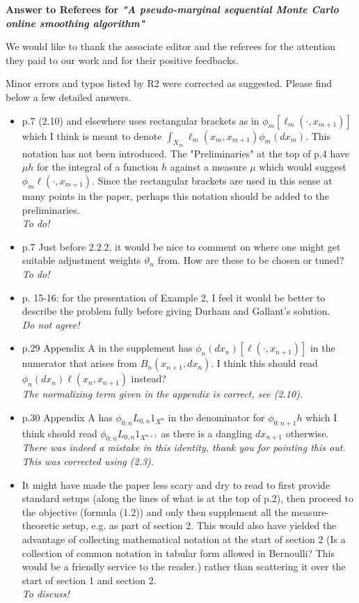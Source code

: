 \documentclass[12pt]{amsart}
\begin{document}
\begin{center}
\textbf{Answer to Referees for \textit{"A pseudo-marginal sequential Monte Carlo online smoothing algorithm"}}
\end{center}

\bigskip

We would like to thank the associate editor and the referees for the attention they paid to our work and for their positive feedbacks. 

\bigskip

Minor errors and typos listed by R2 were corrected as suggested. Please find below a few detailed answers.


\begin{itemize}
\item p.7 (2.10) and elsewhere uses rectangular brackets as in $\phi_m[\ell_m(\cdot,x_{m+1})]$ which I think is meant to denote $\int_{X_m}\ell_m(x_m,x_{m+1})\phi_m(dx_m)$. This notation has not been introduced. The "Preliminaries" at the top of p.4 have $\mu h$ for the integral of a function $h$ against a measure $\mu$ which would suggest $\phi_m \ell(\cdot,x_{m+1})$. Since the rectangular brackets are used in this sense at many points in the paper, perhaps this notation should be added to the preliminaries.\\
{\em To do!}
\item p.7 Just before 2.2.2, it would be nice to comment on where one might get suitable adjustment weights $\vartheta_n$ from. How are these to be chosen or tuned?\\
{\em To do!}
\item p. 15-16: for the presentation of Example 2, I feel it would be better to describe the problem fully before giving Durham and Gallant's solution.\\
{\em Do not agree!}
\item p.29 Appendix A in the supplement has $\phi_n(dx_n)[\ell(\cdot,x_{n+1})]$  in the numerator that arises from $B_n(x_{n+1},dx_n)$. I think this should read $\phi_n(dx_n)\ell(x_n,x_{n+1})$  instead?\\
{\em The normalizing term given in the appendix is correct, see (2.10).}
\item p.30 Appendix A has $\phi_{0:n}L_{0,n}1_{X^n}$  in the denominator for  $\phi_{0:n+1}h$ which I think should read  $\phi_{0:n}L_{0,n}1_{X^{n+1}}$ as there is a dangling $dx_{n+1}$ otherwise.\\
{\em There was indeed a mistake in this identity, thank you for pointing this out. This was corrected using (2.3).}
\item It might have made the paper less scary and dry to read to first provide standard setups (along the lines of what is at the top of p.2), then proceed to the objective (formula (1.2)) and only then supplement all the measure-theoretic setup, e.g. as part of section 2. This would also have yielded the advantage of collecting mathematical notation at the start of section 2 (Is a collection of common notation in tabular form allowed in Bernoulli? This would be a friendly service to the reader.) rather than scattering it over the start of section 1 and section 2.\\
{\em To discuss!}
\end{itemize}
\end{document}
